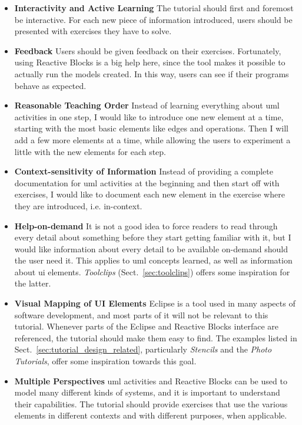 \begin{itemize}
	\item{\textbf{Interactivity and Active Learning}} The tutorial should first and foremost be interactive. For each new piece of information introduced, users should be presented with exercises they have to solve.
	\item{\textbf{Feedback}} Users should be given feedback on their exercises. Fortunately, using Reactive Blocks is a big help here, since the tool makes it possible to actually run the models created. In this way, users can see if their programs behave as expected.
	\item{\textbf{Reasonable Teaching Order}} Instead of learning everything about \gls{uml} activities in one step, I would like to introduce one new element at a time, starting with the most basic elements like edges and operations. Then I will add a few more elements at a time, while allowing the users to experiment a little with the new elements for each step.
	\item{\textbf{Context-sensitivity of Information}} Instead of providing a complete documentation for \gls{uml} activities at the beginning and then start off with exercises, I would like to document each new element in the exercise where they are introduced, i.e. in-context.
	\item{\textbf{Help-on-demand}} It is not a good idea to force readers to read through every detail about something before they start getting familiar with it, but I would like information about every detail to be available on-demand should the user need it. This applies to \gls{uml} concepts learned, as well as information about \gls{ui} elements. \emph{Toolclips} (Sect.~\ref{sec:toolclips}) offers some inspiration for the latter.
	\item{\textbf{Visual Mapping of UI Elements}} Eclipse is a tool used in many aspects of software development, and most parts of it will not be relevant to this tutorial. Whenever parts of the Eclipse and Reactive Blocks interface are referenced, the tutorial should make them easy to find. The examples listed in Sect.~\ref{sec:tutorial_design_related}, particularly \emph{Stencils} and the \emph{Photo Tutorials}, offer some inspiration towards this goal.
	\item{\textbf{Multiple Perspectives}} \gls{uml} activities and Reactive Blocks can be used to model many different kinds of systems, and it is important to understand their capabilities. The tutorial should provide exercises that use the various elements in different contexts and with different purposes, when applicable.

\end{itemize}
